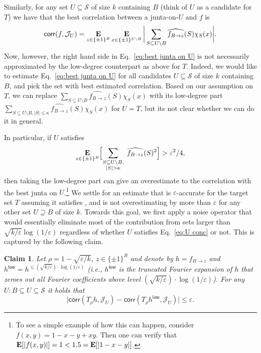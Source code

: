 \documentclass[10pt,a4paper]{article}
\theoremstyle{plain}
\newtheorem{claim}[theorem]{Claim}
\theoremstyle{remark}
\theoremstyle{plain}
\providecommand{\E}{}
\renewcommand{\E}{\mathop{\bf E\/}}
\newcommand{\bigbracket}[1]{\Bigl [ #1 \Bigr ]}
\newcommand{\eps}{\varepsilon}
\renewcommand{\hat}{\widehat}
\newcommand{\pmone}{\{\pm 1\}}
\newcommand{\calJ}{\mathcal{J}}
\newcommand{\calS}{\mathcal{S}}
\newcommand{\InfluentialCoords}{\calS}
\newcommand{\BooleanHypercube}[1]{\{\pm 1\}^{#1}}
\newcommand{\corr}{\mathsf{corr}}
\newcommand{\low}{\mathsf{low}}
\newcommand{\fourierCutoff}{\kappa}
\renewcommand{\epsilon}{\varepsilon}
\begin{document}
     
Similarly, for any  set $U\subseteq \InfluentialCoords$ of size $k$ containing $B$ (think of $U$ as a candidate for $T$) we have that the best correlation between a junta-on-$U$ and $f$ is 
\begin{equation}
\label{eq:best junta on U}
\corr(f, \calJ_{U}) = \E_{z \in \BooleanHypercube{B}} \E_{x \in \BooleanHypercube{U \setminus B}}
     \bigg | \sum_{S \subseteq U\setminus B} \hat{f_{B \to z}}(S)\chi_S(x)\bigg|.
\end{equation}
Now, however, the right hand side in Eq.~\eqref{eq:best junta on U} is not necessarily approximated by the low-degree counterpart as above for $T$.
Indeed, we would like to estimate Eq.~\eqref{eq:best junta on U} for all candidates $U\subseteq \InfluentialCoords$ of size $k$ containing $B$, and pick the set with best estimated correlation.
Based on our assumption on $T$, we can replace $\sum_{S \subseteq U\setminus B} \hat{f_{B \to z}}(S)\chi_S(x)$ with its low-degree part
$\sum_{S \subseteq U\setminus B, |S|\le \fourierCutoff} \hat{f_{B \to z}}(S)\chi_S(x)$ for $U=T$, but its not clear whether we can do it in general.

 
In particular, if $U$ satisfies 
\begin{equation}\label{eq:U conc}
\E_{z\in \pmone^{B}}\bigbracket{\sum_{\substack{S \subseteq U \setminus B, \\ |S| > \fourierCutoff}} \;\hat{f_{B \to z}}(S)^2} >\epsilon^2/4,
\end{equation}
then taking the low-degree part can give an overestimate to the correlation with the best junta on $U$.\footnote{To see a simple example of how this can happen, consider $f(x,y) = 1 -x- y+xy$. Then one can verify that $\E[|f(x,y)|] = 1 < 1.5 = \E[|1-x-y|]$.}
We settle for an estimate that is $\eps$-accurate for the target set $T$ assuming it satisfies , and is not overestimating by more than $\eps$ for any other set $U\supseteq B$ of size $k$.
Towards this goal, we first apply a noise operator that would essentially eliminate most of the contribution from sets larger than $\sqrt{k/\eps} \log(1/\eps)$ regardless of whether $U$ satisfies Eq.~\eqref{eq:U conc} or not. 
This is captured by the following claim.

\begin{claim}\label{claim:cor noise to cor noise low deg}
Let $\rho = 1-\sqrt{\eps/k}$, $z\in \pmone^B$ and denote by $h = f_{B\to z}$ and $h^{\low} = h^{\leq (\sqrt{k/\eps})\cdot \log(1/\eps)}$ (i.e., $h^{\low}$ is the truncated Fourier expansion of $h$ that zeroes out all Fourier coefficients above level $(\sqrt{k/\eps})\cdot \log(1/\eps)$).
For any $U:B \subseteq U \subseteq \InfluentialCoords$ it holds that
$$
\bigg|\corr\left(T_\rho h, \calJ_U\right) - \corr\left(T_\rho h^{\low}, \calJ_U\right)\bigg| \leq \eps.
$$

\end{claim}
 
\end{document}
